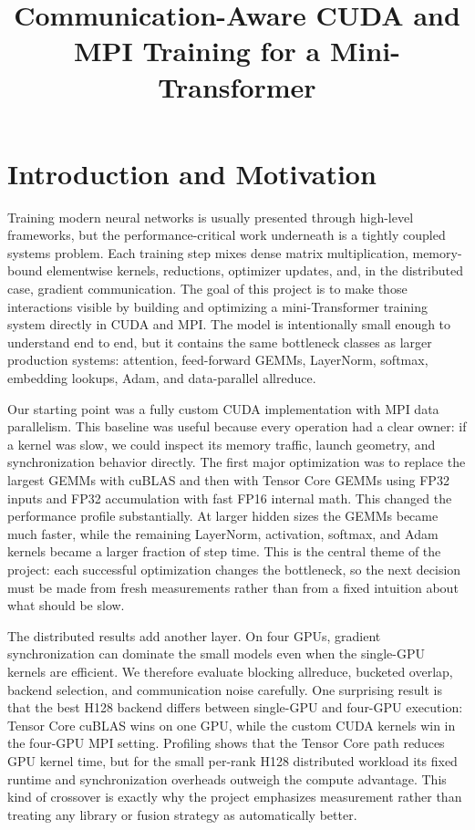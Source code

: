 \documentclass[10pt]{article}
\title{Communication-Aware CUDA and MPI Training for a Mini-Transformer}
\author{}
\date{}
\begin{document}
\maketitle

\section{Introduction and Motivation}
Training modern neural networks is usually presented through high-level
frameworks, but the performance-critical work underneath is a tightly coupled
systems problem.  Each training step mixes dense matrix multiplication,
memory-bound elementwise kernels, reductions, optimizer updates, and, in the
distributed case, gradient communication.  The goal of this project is to make
those interactions visible by building and optimizing a mini-Transformer
training system directly in CUDA and MPI.  The model is intentionally small
enough to understand end to end, but it contains the same bottleneck classes as
larger production systems: attention, feed-forward GEMMs, LayerNorm, softmax,
embedding lookups, Adam, and data-parallel allreduce.

Our starting point was a fully custom CUDA implementation with MPI data
parallelism.  This baseline was useful because every operation had a clear
owner: if a kernel was slow, we could inspect its memory traffic, launch
geometry, and synchronization behavior directly.  The first major optimization
was to replace the largest GEMMs with cuBLAS and then with Tensor Core GEMMs
using FP32 inputs and FP32 accumulation with fast FP16 internal math.  This
changed the performance profile substantially.  At larger hidden sizes the
GEMMs became much faster, while the remaining LayerNorm, activation, softmax,
and Adam kernels became a larger fraction of step time.  This is the central
theme of the project: each successful optimization changes the bottleneck, so
the next decision must be made from fresh measurements rather than from a fixed
intuition about what should be slow.

The distributed results add another layer.  On four GPUs, gradient
synchronization can dominate the small models even when the single-GPU kernels
are efficient.  We therefore evaluate blocking allreduce, bucketed overlap,
backend selection, and communication noise carefully.  One surprising result is
that the best H128 backend differs between single-GPU and four-GPU execution:
Tensor Core cuBLAS wins on one GPU, while the custom CUDA kernels win in the
four-GPU MPI setting.  Profiling shows that the Tensor Core path reduces GPU
kernel time, but for the small per-rank H128 distributed workload its fixed
runtime and synchronization overheads outweigh the compute advantage.  This
kind of crossover is exactly why the project emphasizes measurement rather
than treating any library or fusion strategy as automatically better.
\end{document}
